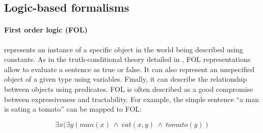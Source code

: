 



\subsection{Logic-based formalisms}






\paragraph{First order logic (FOL)} represents an instance of a specific object in the world being described using constants. As in the truth-conditional theory detailed in , FOL representations allow to evaluate a sentence as true or false. It can also represent an unspecified object of a given type using variables. Finally, it can describe the relationship between objects using predicates. FOL is often described as a good compromise between expressiveness and tractability. For example, the simple sentence “a man is eating a tomato” can be mapped to FOL:

\begin{equation}
    \exists x (\exists y (man(x) \ \land \ eat(x, y) \  \land \ tomato(y))
\end{equation}

